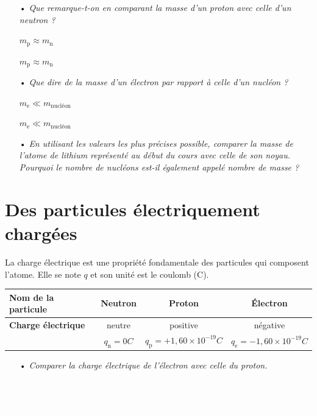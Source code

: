 \documentclass[12pt,a4paper]{article}
\begin{document}
\begin{itemize}
\item[•] \emph{Que remarque-t-on en comparant la masse d'un proton avec celle d'un neutron ?}

{\color{white} $m_\mathrm{p} \approx m_\mathrm{n}$}

{\color{white} $m_\mathrm{p} \approx m_\mathrm{n}$}

\item[•] \emph{Que dire de la masse d'un électron par rapport à celle d'un nucléon ?}

{\color{white} $m_\mathrm{e} \ll m_\mathrm{nucléon}$}

{\color{white} $m_\mathrm{e} \ll m_\mathrm{nucléon}$}

\item[•] \emph{En utilisant les valeurs les plus précises possible, comparer la masse de l'atome de lithium représenté au début du cours avec celle de son noyau.
Pourquoi le nombre de nucléons est-il également appelé nombre de masse ?}
\end{itemize}

\newpage

\section{Des particules électriquement chargées}

La charge électrique est une propriété fondamentale des particules qui composent l'atome.
Elle se note $q$ et son unité est le coulomb (C).
\begin{center}
\begin{tabular}{l|c|c|c}
\textbf{Nom de la particule} & Neutron & Proton & Électron \\
\hline
\textbf{Charge électrique} 	& neutre 	& positive 	& négative \\
							& $q_\mathrm{n} = \unit{0}{C}$ & $q_\mathrm{p} = \unit{+1{,}60\times10^{-19}}{C}$ & $q_\mathrm{e} = \unit{-1{,}60\times10^{-19}}{C}$
\end{tabular}
\end{center}

\begin{itemize}
\item[•] \emph{Comparer la charge électrique de l'électron avec celle du proton.}

\textcolor{white}{opposée}

\textcolor{white}{opposée}
\end{itemize}
\end{document}
